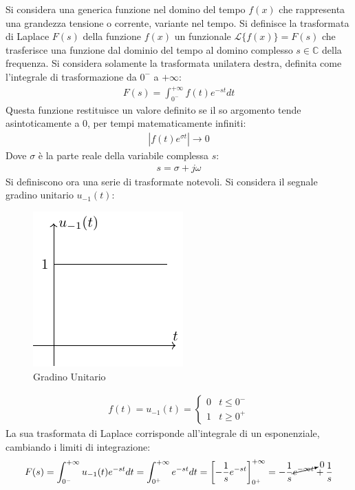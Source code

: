 \documentclass{article}
\numberwithin{equation}{subsection}
\begin{document}
Si considera una generica funzione nel domino del tempo $f(x)$ che rappresenta una grandezza tensione o corrente, variante nel tempo. 
Si definisce la trasformata di Laplace $F(s)$ della funzione $f(x)$ un funzionale $\mathcal{L}\{f(x)\}=F(s)$ che trasferisce una funzione dal dominio del tempo al domino 
complesso $s\in\mathbb{C}$ della frequenza. Si considera solamente la trasformata unilatera destra, definita come l'integrale di trasformazione da $0^-$ a $+\infty$:
\begin{gather}
    F(s)=\displaystyle\int_{0^-}^{+\infty}f(t)e^{-st}dt
\end{gather}
Questa funzione restituisce un valore definito se il so argomento tende asintoticamente a $0$, per tempi matematicamente infiniti:
\begin{gather*}
    |f(t)e^{\sigma t}|\to0
\end{gather*}
Dove $\sigma$ è la parte reale della variabile complessa $s$:
\begin{gather*}
    s=\sigma+j\omega
\end{gather*}
Si definiscono ora una serie di trasformate notevoli. Si considera il segnale gradino unitario $u_{-1}(t)$:
\begin{figure}[ht]%
    \centering
    \includegraphics{gradino-unitario.pdf}
    \caption{Gradino Unitario}
    \label{fig:gradino-unitario}
\end{figure}
\begin{gather*}
    f(t)=u_{-1}(t)=\begin{cases}
        0&t\leq 0^-\\
        1&t\geq 0^+
    \end{cases}
\end{gather*}
La sua trasformata di Laplace corrisponde all'integrale di un esponenziale, cambiando i limiti di integrazione:
\begin{gather*}
    F(s)=\displaystyle\int_{0^-}^{+\infty}u_{-1}(t)e^{-st}dt=\int_{0^+}^{+\infty}e^{-st}dt=\left[-\frac{1}{s}e^{-st}\right]_{0^+}^{+\infty}=-\frac{1}{s}\cancelto{0}{e^{-\infty t}}+\frac{1}{s}
\end{gather*}
\end{document}
